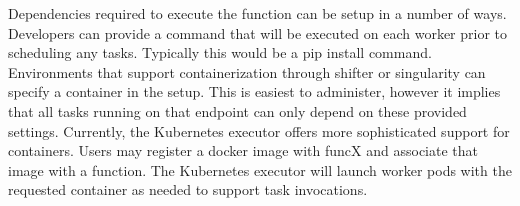 Dependencies required to execute the function can be setup in a number of ways. Developers can provide a command that will be executed on each worker prior to scheduling any tasks. Typically this would be a pip install command. Environments that support containerization through shifter or singularity can specify a container in the setup. This is easiest to administer, however it implies that all tasks running on that endpoint can only depend on these provided settings. Currently, the Kubernetes executor offers more sophisticated support for containers. Users may register a docker image with funcX and associate that image with a function. The Kubernetes executor will launch worker pods with the requested container as needed to support task invocations.